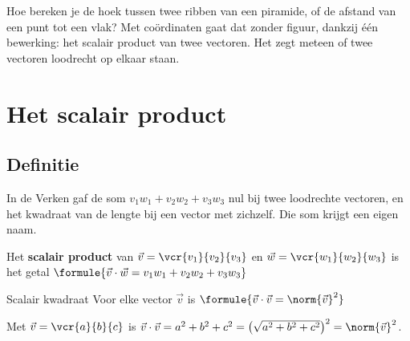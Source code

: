 %



Hoe bereken je de hoek tussen twee ribben van een piramide, of de afstand van een punt tot een vlak? Met coördinaten gaat dat zonder figuur, dankzij één bewerking: het scalair product van twee vectoren. Het zegt meteen of twee vectoren loodrecht op elkaar staan.

\begin{oefeningen}[Start]

\end{oefeningen}

\section{Het scalair product}

\subsection{Definitie}

In de Verken gaf de som $v_1w_1 + v_2w_2 + v_3w_3$ nul bij twee loodrechte vectoren, en het kwadraat van de lengte bij een vector met zichzelf. Die som krijgt een eigen naam.

\begin{theorie}
Het \textbf{\textcolor{accent}{scalair product}} van $\vec v = \vcr{v_1}{v_2}{v_3}$ en $\vec w = \vcr{w_1}{w_2}{w_3}$ is het getal \quad $\formule{\vec v \cdot \vec w = v_1w_1 + v_2w_2 + v_3w_3}$
\begin{stelling}{Scalair kwadraat}
Voor elke vector $\vec v$ is \quad $\formule{\vec v \cdot \vec v = \norm{\vec v}^2}$
\end{stelling}
\begin{bewijs}
Met $\vec v = \vcr{a}{b}{c}$ is $\vec v \cdot \vec v = a^2 + b^2 + c^2 = \bigl(\sqrt{a^2 + b^2 + c^2}\bigr)^2 = \norm{\vec v}^2$.
\end{bewijs}
\end{theorie}

